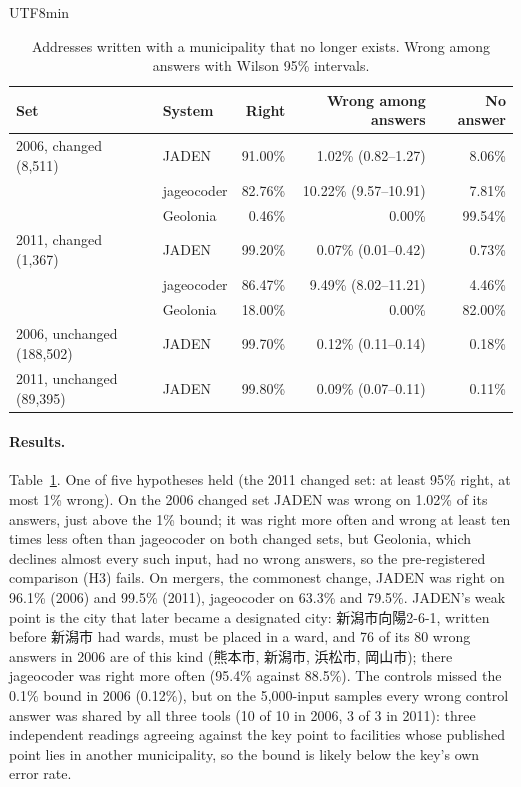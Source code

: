 \documentclass[10pt]{article}
\begin{document}
\begin{CJK}{UTF8}{min}
\begin{table}[t]\centering\small
\caption{Addresses written with a municipality that no longer exists. Wrong among answers with Wilson 95\%
intervals.}\label{tab:history}
\begin{tabular}{llrrr}\toprule
Set & System & Right & Wrong among answers & No answer \\ \midrule
2006, changed (8,511) & JADEN & 91.00\% & 1.02\% (0.82--1.27) & 8.06\% \\
 & jageocoder & 82.76\% & 10.22\% (9.57--10.91) & 7.81\% \\
 & Geolonia & 0.46\% & 0.00\% & 99.54\% \\
2011, changed (1,367) & JADEN & 99.20\% & 0.07\% (0.01--0.42) & 0.73\% \\
 & jageocoder & 86.47\% & 9.49\% (8.02--11.21) & 4.46\% \\
 & Geolonia & 18.00\% & 0.00\% & 82.00\% \\
2006, unchanged (188,502) & JADEN & 99.70\% & 0.12\% (0.11--0.14) & 0.18\% \\
2011, unchanged (89,395) & JADEN & 99.80\% & 0.09\% (0.07--0.11) & 0.11\% \\ \bottomrule
\end{tabular}
\end{table}

\paragraph{Results.} Table~\ref{tab:history}. One of five hypotheses held (the 2011 changed set: at least
95\% right, at most 1\% wrong). On the 2006 changed set JADEN was wrong on 1.02\% of its answers, just
above the 1\% bound; it was right more often and wrong at least ten times less often than jageocoder on both changed
sets, but Geolonia, which declines almost every such input, had no wrong answers, so the pre-registered
comparison (H3) fails. On mergers, the commonest change, JADEN was right on 96.1\% (2006) and 99.5\% (2011),
jageocoder on 63.3\% and 79.5\%. JADEN's weak point is the city that later became a designated city:
新潟市向陽2-6-1, written before 新潟市 had wards, must be placed in a ward, and 76 of its 80 wrong
answers in 2006 are of this kind (熊本市, 新潟市, 浜松市, 岡山市); there jageocoder was right more often
(95.4\% against 88.5\%). The controls missed the 0.1\% bound in 2006 (0.12\%), but on the 5,000-input
samples every wrong control answer was shared by all three tools (10 of 10 in 2006, 3 of 3 in 2011):
three independent readings agreeing against the key point to facilities whose published point lies in
another municipality, so the bound is likely below the key's own error rate.


\end{CJK}
\end{document}
